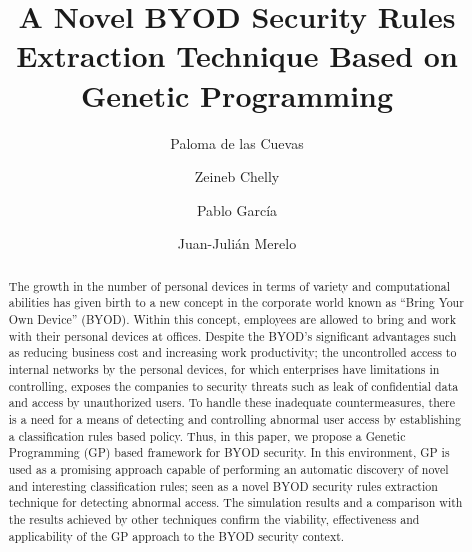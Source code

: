 \documentclass[runningheads,a4paper]{llncs}
\begin{document}
\mainmatter  %

\title{A Novel BYOD Security Rules Extraction Technique Based on Genetic Programming}


%
\author{Paloma de las Cuevas %
\and Zeineb Chelly \and Pablo Garc\'ia \and Juan-Juli\'an Merelo }
%


\maketitle


\begin{abstract}
The growth in the number of personal devices in terms of variety and computational
abilities has given birth to a new concept in the corporate world
known as ``Bring Your Own Device'' (BYOD).
Within this concept,
employees are allowed to bring and work with their personal devices at
offices. Despite the BYOD's significant advantages such as reducing
business cost and increasing work productivity; the uncontrolled
access to internal networks by the personal devices, for which
enterprises have limitations in controlling, exposes the companies to
security threats such as leak of confidential data and access by
unauthorized users. To handle these inadequate countermeasures,
 there
is a need for a means of detecting and controlling abnormal user
access by establishing a classification rules based policy. Thus, in
this paper, we propose a Genetic Programming (GP) based framework for
BYOD security. In this environment, GP is used as a promising approach
capable of performing an automatic discovery of novel and interesting
classification rules; seen as a novel BYOD security rules extraction
technique for detecting abnormal access. The simulation results and a
comparison with the results achieved by other techniques confirm the
viability, effectiveness and applicability of the GP approach to the
BYOD security context.
\end{abstract}
\end{document}
